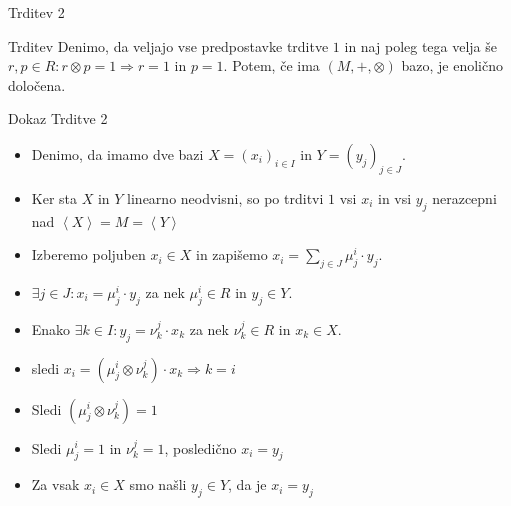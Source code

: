 \documentclass[t, 11pt]{beamer} %
\newcommand{\Gen}[1]{\ensuremath{\left<{#1}\right>}}
\begin{document}
\begin{frame}{Trditev 2}
	\begin{block}{Trditev}
		Denimo, da veljajo vse predpostavke trditve $1$ in naj poleg tega velja še $r, p\in R: r\otimes p = 1\Rightarrow r = 1$ in $p = 1$. Potem, če ima $(M, +, \otimes)$ bazo, je enolično določena.
	\end{block}
\end{frame}

\begin{frame}{Dokaz Trditve 2}
	\begin{itemize}
		\item Denimo, da imamo dve bazi $X = (x_i)_{i\in I}$ in $Y = (y_j)_{j\in J}$.
		\item Ker sta $X$ in $Y$ linearno neodvisni, so po trditvi $1$ vsi $x_i$ in vsi $y_j$ nerazcepni nad $\Gen{X} = M = \Gen{Y}$
		\item Izberemo poljuben $x_i\in X$ in zapišemo $x_i = \sum_{j\in J}\mu_j^i\cdot y_j$.
		\item $\exists j\in J: x_i = \mu_j^i\cdot y_j$ za nek $\mu_j^i\in R$ in $y_j\in Y$.
		\item Enako $\exists k\in I: y_j = \nu_k^j\cdot x_k$ za nek $\nu_k^j\in R$ in $x_k\in X$.
		\item sledi $x_i = (\mu_j^i\otimes \nu_k^j)\cdot x_k \Rightarrow k = i$
		\item Sledi $(\mu_j^i\otimes \nu_k^j) = 1$ 
		\item Sledi $\mu_j^i = 1$ in  $\nu_k^j = 1$, posledično $x_i = y_j$
		\item Za vsak $x_i\in X$ smo našli $y_j\in Y$, da je $x_i = y_j$
	\end{itemize}
\end{frame}
\end{document}
